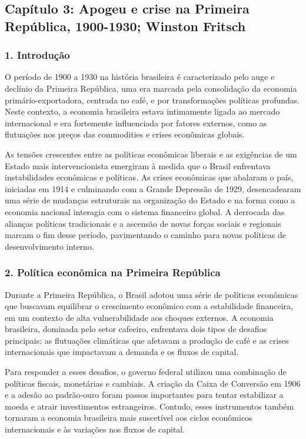 \documentclass[a4paper,12pt]{article}[abntex2]
\begin{document}
\newpage

\subsection{\textbf{Capítulo 3: Apogeu e crise na Primeira República, 1900-1930; Winston Fritsch}}

\subsubsection{\textbf{1. Introdução}}

O período de 1900 a 1930 na história brasileira é caracterizado pelo auge e declínio da Primeira República, uma era marcada pela consolidação da economia primário-exportadora, centrada no café, e por transformações políticas profundas. Neste contexto, a economia brasileira estava intimamente ligada ao mercado internacional e era fortemente influenciada por fatores externos, como as flutuações nos preços das commodities e crises econômicas globais.

As tensões crescentes entre as políticas econômicas liberais e as exigências de um Estado mais intervencionista emergiram à medida que o Brasil enfrentava instabilidades econômicas e políticas. As crises econômicas que abalaram o país, iniciadas em 1914 e culminando com a Grande Depressão de 1929, desencadearam uma série de mudanças estruturais na organização do Estado e na forma como a economia nacional interagia com o sistema financeiro global. A derrocada das alianças políticas tradicionais e a ascensão de novas forças sociais e regionais marcam o fim desse período, pavimentando o caminho para novas políticas de desenvolvimento interno.

\subsubsection{\textbf{2. Política econômica na Primeira República}}

Durante a Primeira República, o Brasil adotou uma série de políticas econômicas que buscavam equilibrar o crescimento econômico com a estabilidade financeira, em um contexto de alta vulnerabilidade aos choques externos. A economia brasileira, dominada pelo setor cafeeiro, enfrentava dois tipos de desafios principais: as flutuações climáticas que afetavam a produção de café e as crises internacionais que impactavam a demanda e os fluxos de capital.

Para responder a esses desafios, o governo federal utilizou uma combinação de políticas fiscais, monetárias e cambiais. A criação da Caixa de Conversão em 1906 e a adesão ao padrão-ouro foram passos importantes para tentar estabilizar a moeda e atrair investimentos estrangeiros. Contudo, esses instrumentos também tornaram a economia brasileira mais suscetível aos ciclos econômicos internacionais e às variações nos fluxos de capital.
\end{document}
